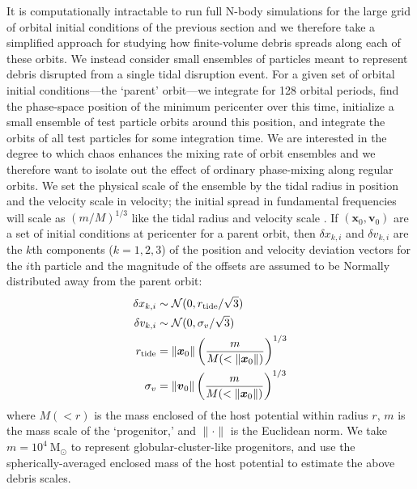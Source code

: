 \documentclass[letterpaper,12pt,preprint]{aastex}
\newcommand{\msun}{\ensuremath{\mathrm{M}_\odot}}
\newcommand{\bs}[1]{\boldsymbol{#1}}
\begin{document}
It is computationally intractable to run full N-body simulations for the large grid of orbital initial conditions of the previous section and we therefore take a simplified approach for studying how finite-volume debris spreads along each of these orbits. We instead consider small ensembles of particles meant to represent debris disrupted from a single tidal disruption event. For a given set of orbital initial conditions---the `parent' orbit---we integrate for 128 orbital periods, find the phase-space position of the minimum pericenter over this time, initialize a small ensemble of test particle orbits around this position, and integrate the orbits of all test particles for some integration time. We are interested in the degree to which chaos enhances the mixing rate of orbit ensembles and we therefore want to isolate out the effect of ordinary phase-mixing along regular orbits. We set the physical scale of the ensemble by the tidal radius in position and the velocity scale in velocity; the initial spread in fundamental frequencies will scale as $(m/M)^{1/3}$ like the tidal radius and velocity scale \citep[e.g.,][]{johnston98, apw14}. If $(\bs{x}_0,\bs{v}_0)$ are a set of initial conditions at pericenter for a parent orbit, then $\delta x_{k,i}$ and $\delta v_{k,i}$ are the $k$th components ($k=1,2,3$) of the position and velocity deviation vectors for the $i$th particle and the magnitude of the offsets are assumed to be Normally distributed away from the parent orbit:
\begin{align}
	\delta x_{k,i} &\sim \mathcal{N}(0, r_{\rm tide}/\sqrt{3})\\
	\delta v_{k,i} &\sim \mathcal{N}(0, \sigma_v/\sqrt{3})\\
	r_{\rm tide} &= \|\bs{x}_0\| \left(\frac{m}{M(<\|\bs{x}_0\|)}\right)^{1/3} \\
	\sigma_v &= \|\bs{v}_0\|\left(\frac{m}{M(<\|\bs{x}_0\|)}\right)^{1/3}
\end{align}
where $M(<r)$ is the mass enclosed of the host potential within radius $r$, $m$ is the mass scale of the `progenitor,' and $\|\cdot \|$ is the Euclidean norm. We take $m=10^4~\msun$ to represent globular-cluster-like progenitors, and use the spherically-averaged enclosed mass of the host potential to estimate the above debris scales. %
\end{document}
